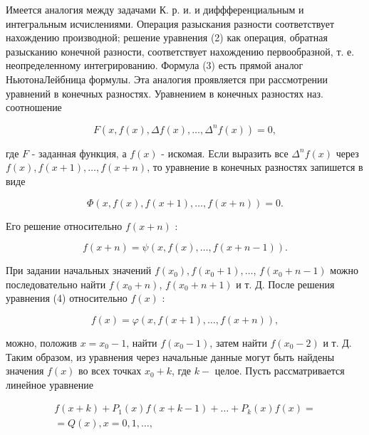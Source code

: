 \documentclass[10pt]{article}
\begin{document}
Имеется аналогия между задачами К. р. и. и диффференциальным и интегральным исчислениями. Операция разыскания разности соответствует нахождению производной; решение уравнения (2) как операция, обратная разысканию конечной разности, соответствует нахождению первообразной, т. е. неопределенному интегрированию. Формула (3) есть прямой аналог НьютонаЛейбница формулы. Эта аналогия проявляется при рассмотрении уравнений в конечных разностях. Уравнением в конечных разностях наз. соотношение



\[

F\left(x, f(x), \Delta f(x), \ldots, \Delta^{n} f(x)\right)=0,

\]



где $F$ - заданная функция, а $f(x)$ - искомая. Если выразить все $\Delta^{n} f(x)$ через $f(x), f(x+1), \ldots, f(x+n)$, то уравнение в конечных разностях запишется в виде



\[

\Phi(x, f(x), f(x+1), \ldots, f(x+n))=0 .

\]



Его решение относительно $f(x+n)$ :



\[

f(x+n)=\psi(x, f(x), \ldots, f(x+n-1)) .

\]



При задании начальных значений $f\left(x_{0}\right), f\left(x_{0}+1\right), \ldots$, $f\left(x_{0}+n-1\right)$ можно последовательно найти $f\left(x_{0}+n\right)$, $f\left(x_{0}+n+1\right)$ и т. Д. После решения уравнения (4) относительно $f(x)$ :



\[

f(x)=\varphi(x, f(x+1), \ldots, f(x+n)),

\]



можно, положив $x=x_{0}-1$, найти $f\left(x_{0}-1\right)$, затем найти $f\left(x_{0}-2\right)$ и т. Д. Таким образом, из уравнения через начальные данные могут быть найдены значения $f(x)$ во всех точках $x_{0}+k$, где $k-$ целое. Пусть рассматривается линейное уравнение



\[

\begin{gathered}

f(x+k)+P_{1}(x) f(x+k-1)+\ldots+P_{k}(x) f(x)= \\

=Q(x), x=0,1, \ldots,

\end{gathered}

\]
\end{document}
